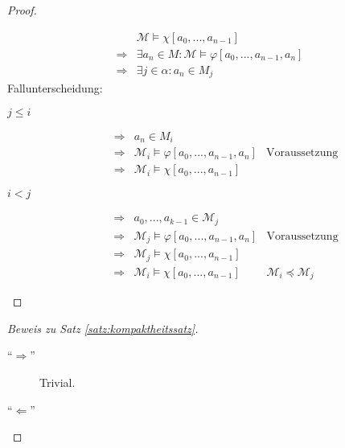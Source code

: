 \documentclass{article}
\theoremstyle{definition}
\theoremstyle{plain}
\newcommand{\m}[1]{\mathcal{#1}}
\begin{document}
\begin{proof}
\begin{description}
            \begin{align*}
                & \m{M} \models \chi[a_0, ..., a_{n - 1}] \\
                \Rightarrow & \exists a_n \in M: \m{M} \models \varphi[a_0, ..., a_{n - 1}, a_n] \\
                \Rightarrow & \exists j \in \alpha: a_n \in M_j
            \end{align*}
            Fallunterscheidung:
            \begin{description}
                \item[$ j \leq i $]
                \begin{align*}
                    \Rightarrow & a_n \in M_i \\
                    \Rightarrow & \m{M}_i \models \varphi[a_0, ..., a_{n - 1}, a_n] & \text{Voraussetzung} \\
                    \Rightarrow & \m{M}_i \models \chi[a_0, ..., a_{n - 1}]
                \end{align*}
                \item[$ i < j $]
                \begin{align*}
                    \Rightarrow & a_0, ..., a_{k - 1} \in \m{M}_j \\
                    \Rightarrow & \m{M}_j \models \varphi[a_0, ..., a_{n - 1}, a_n] & \text{Voraussetzung} \\
                    \Rightarrow & \m{M}_j \models \chi[a_0, ..., a_{n - 1}] \\
                    \Rightarrow & \m{M}_i \models \chi[a_0, ..., a_{n -1}] & \m{M}_i \preceq \m{M}_j
                \end{align*}
            \end{description}
        \end{description}
    \end{proof}

    \begin{proof}[Beweis zu Satz \ref{satz:kompaktheitssatz}]
        ~\par
        \begin{description}
            \item[``$ \Rightarrow $''] Trivial.
            \item[``$ \Leftarrow $'']
        \end{description}
    \end{proof}
\end{document}
